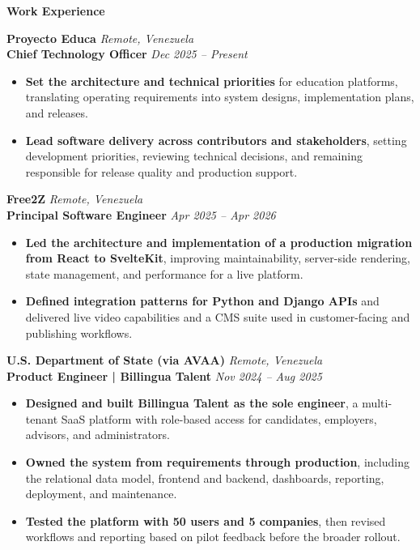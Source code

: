 \documentclass[11pt]{article}
\begin{document}
\vspace{8pt}
\begin{center}
    \textbf{Work Experience}
\end{center}
\vspace{-4pt}

\textbf{Proyecto Educa} \hfill \textit{Remote, Venezuela} \\
\textbf{Chief Technology Officer} \hfill \textit{Dec 2025 -- Present}
\begin{itemize}
    \item \textbf{Set the architecture and technical priorities} for education platforms, translating operating requirements into system designs, implementation plans, and releases.
    \item \textbf{Lead software delivery across contributors and stakeholders}, setting development priorities, reviewing technical decisions, and remaining responsible for release quality and production support.
\end{itemize}

\vspace{10pt}
\textbf{Free2Z} \hfill \textit{Remote, Venezuela} \\
\textbf{Principal Software Engineer} \hfill \textit{Apr 2025 -- Apr 2026}
\begin{itemize}
    \item \textbf{Led the architecture and implementation of a production migration from React to SvelteKit}, improving maintainability, server-side rendering, state management, and performance for a live platform.
    \item \textbf{Defined integration patterns for Python and Django APIs} and delivered live video capabilities and a CMS suite used in customer-facing and publishing workflows.
\end{itemize}

\vspace{10pt}
\textbf{U.S. Department of State (via AVAA)} \hfill \textit{Remote, Venezuela} \\
\textbf{Product Engineer | Billingua Talent} \hfill \textit{Nov 2024 -- Aug 2025}
\begin{itemize}
    \item \textbf{Designed and built Billingua Talent as the sole engineer}, a multi-tenant SaaS platform with role-based access for candidates, employers, advisors, and administrators.
    \item \textbf{Owned the system from requirements through production}, including the relational data model, frontend and backend, dashboards, reporting, deployment, and maintenance.
    \item \textbf{Tested the platform with 50 users and 5 companies}, then revised workflows and reporting based on pilot feedback before the broader rollout.
\end{itemize}
\end{document}
